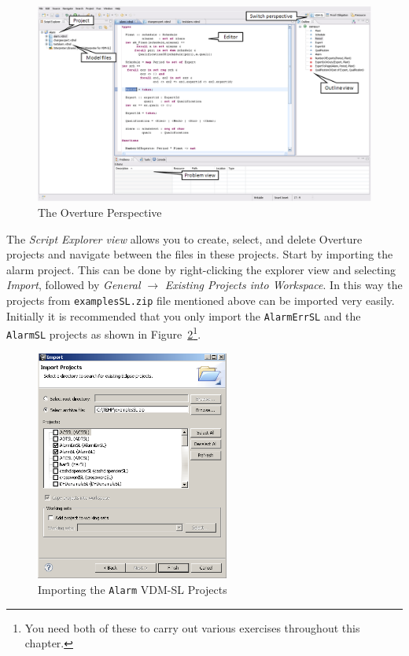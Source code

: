 \begin{figure}[tbh]
\begin{center}
  \includegraphics[width=5.5in]{figures/OverturePerspective}
  \caption[labelInTOC]{The Overture Perspective}
  \label{fig:OverturePerspective}
\end{center}
\end{figure}

The \emph{Script Explorer view} allows you to create, select, and
delete Overture projects and navigate between the files in these
projects. Start by importing the alarm project. This can be done by
right-clicking the explorer view and selecting \emph{Import}, followed
by \emph{General} $\rightarrow$ \emph{Existing Projects into
  Workspace}.  In this way the projects from \texttt{examplesSL.zip} file
mentioned above can be imported very easily. Initially it is
recommended that you only import the \texttt{AlarmErrSL} and the
\texttt{AlarmSL} projects as shown in
Figure~\ref{fig:importalarm}\footnote{You need both of these to
  carry out various exercises throughout this chapter.}.

\begin{figure}[!htb]
\begin{center}
  \includegraphics[width=2.5in]{figures/importalarm}
  \caption[labelInTOC]{Importing the \texttt{Alarm} VDM-SL Projects}
  \label{fig:importalarm}
\end{center}
\end{figure}

